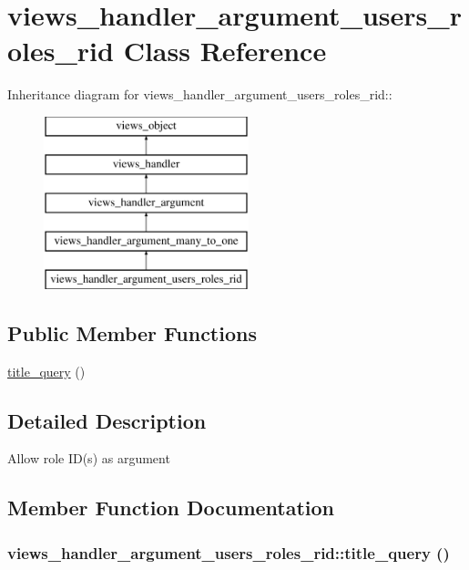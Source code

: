 \hypertarget{classviews__handler__argument__users__roles__rid}{
\section{views\_\-handler\_\-argument\_\-users\_\-roles\_\-rid Class Reference}
\label{classviews__handler__argument__users__roles__rid}
}
Inheritance diagram for views\_\-handler\_\-argument\_\-users\_\-roles\_\-rid::\begin{figure}[H]
\begin{center}
\leavevmode
\includegraphics[height=5cm]{classviews__handler__argument__users__roles__rid}
\end{center}
\end{figure}
\subsection*{Public Member Functions}
\begin{CompactItemize}
\item 
\hyperlink{classviews__handler__argument__users__roles__rid_0cc229ef972f8a7d9184b45443271992}{title\_\-query} ()
\end{CompactItemize}


\subsection{Detailed Description}
Allow role ID(s) as argument 

\subsection{Member Function Documentation}
\hypertarget{classviews__handler__argument__users__roles__rid_0cc229ef972f8a7d9184b45443271992}{
\subsubsection[{title\_\-query}]{\setlength{\rightskip}{0pt plus 5cm}views\_\-handler\_\-argument\_\-users\_\-roles\_\-rid::title\_\-query ()}}
\label{classviews__handler__argument__users__roles__rid_0cc229ef972f8a7d9184b45443271992}


